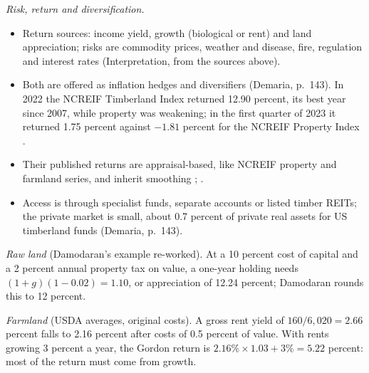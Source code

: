 \begin{qfmethod}
\emph{Risk, return and diversification.}
\begin{itemize}
\item Return sources: income yield, growth (biological or rent) and land appreciation; risks are commodity prices, weather and disease, fire, regulation and interest rates (Interpretation, from the sources above).
\item Both are offered as inflation hedges and diversifiers (Demaria, p.~143). In 2022 the NCREIF Timberland Index returned 12.90 percent, its best year since 2007, while property was weakening; in the first quarter of 2023 it returned 1.75 percent against $-1.81$ percent for the NCREIF Property Index \citep[p.~28]{ncreif-timberland-2023q1}.
\item Their published returns are appraisal-based, like NCREIF property and farmland series, and inherit smoothing \citep[pp.~742--743]{investment-valuation-2012}; \citep[pp.~416--421]{s7-ang}.
\item Access is through specialist funds, separate accounts or listed timber REITs; the private market is small, about 0.7 percent of private real assets for US timberland funds (Demaria, p.~143).
\end{itemize}

 \emph{Raw land} (Damodaran's example re-worked). At a 10 percent cost of capital and a 2 percent annual property tax on value, a one-year holding needs $(1+g)(1-0.02)=1.10$, or appreciation of 12.24 percent; Damodaran rounds this to 12 percent.

\emph{Farmland} (USDA averages, original costs). A gross rent yield of $160/6{,}020=2.66$ percent falls to 2.16 percent after costs of 0.5 percent of value. With rents growing 3 percent a year, the Gordon return is $2.16\%\times1.03+3\%=5.22$ percent: most of the return must come from growth.


\end{qfmethod}
